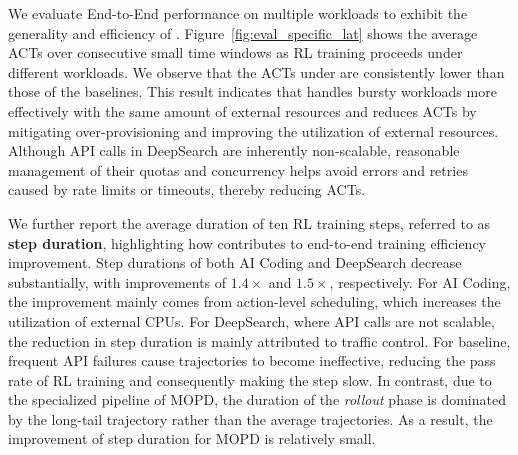 We evaluate End-to-End performance on multiple workloads to exhibit the generality and efficiency of \sysname. 
Figure~\ref{fig:eval_specific_lat} shows the average ACTs over consecutive small time windows as RL training proceeds under different workloads. We observe that the ACTs under \sysname are consistently lower than those of the baselines. This result indicates that \sysname handles bursty workloads more effectively with the same amount of external resources and reduces ACTs by mitigating over-provisioning and improving the utilization of external resources. Although API calls in DeepSearch are inherently non-scalable, reasonable management of their quotas and concurrency helps avoid errors and retries caused by rate limits or timeouts, thereby reducing ACTs.

We further report the average duration of ten RL training steps, referred to as \textbf{step duration}, highlighting how \sysname contributes to end-to-end training efficiency improvement. Step durations of both AI Coding and DeepSearch decrease substantially, with improvements of $1.4\times$ and $1.5\times$, respectively.
For AI Coding, the improvement mainly comes from action-level scheduling, which increases the utilization of external CPUs.
For DeepSearch, where API calls are not scalable, the reduction in step duration is mainly attributed to traffic control.
For baseline, frequent API failures cause trajectories to become ineffective, reducing the pass rate of RL training and consequently making the step slow. 
In contrast, due to the specialized pipeline of MOPD, the duration of the \textit{rollout} phase is dominated by the long-tail trajectory rather than the average trajectories.
As a result, the improvement of step duration for MOPD is relatively small. 

